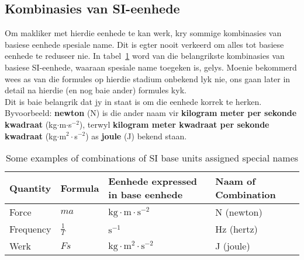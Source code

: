 \subsection*{Kombinasies van SI-eenhede}
            \nopagebreak
Om makliker met hierdie eenhede te kan werk, kry sommige kombinasies van basiese eenhede spesiale name. Dit is egter nooit verkeerd om alles tot basiese eenhede te reduseer nie. In tabel~\ref{tab:SIcombinations} word van die belangrikste kombinasies van basiese SI-eenhede, waaraan spesiale name toegeken is, gelys. Moenie bekommerd wees as van die formules op hierdie stadium onbekend lyk nie, ons gaan later in detail na hierdie (en nog baie ander) formules kyk. \\ 
Dit is baie belangrik dat jy in staat is om die eenhede korrek te herken. Byvoorbeeld: \textbf{newton} (N) is die ander naam vir \textbf{kilogram meter per sekonde kwadraat} (kg$\ensuremath{\cdot}$m$\ensuremath{\cdot}$s${}^{-2}$), terwyl \textbf{kilogram meter kwadraat per sekonde kwadraat} (kg$\ensuremath{\cdot}$m${}^{2}\ensuremath{\cdot}$s${}^{-2}$) as \textbf{joule} (J) bekend staan.
          \begin{table}[H]
        \begin{center}
\noindent
      \begin{tabular}{|l|l|l|l|}\hline
\textbf{Quantity} & \textbf{Formula} & \textbf{Eenhede expressed in base eenhede}              & \textbf{Naam of Combination} \\ \hline
Force             & $ma$             & $\text{kg}\cdot \text{m} \cdot \text{s}^{-2}$      & N (newton)                   \\ \hline
Frequency         & $\frac{1}{T}$    & $\text{s}^{-1}$                                    & Hz (hertz)                   \\ \hline
Werk              & $Fs$             & $\text{kg} \cdot \text{m}^{2} \cdot \text{s}^{-2}$ & J (joule)                    \\ \hline
    \end{tabular}
\caption{Some examples of combinations of SI base units assigned special names}
\label{tab:SIcombinations}
      \end{center}
\end{table}
    \par
\label{m30853*notfhsst!!!underscore!!!id306}
